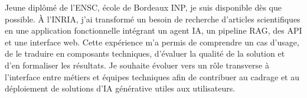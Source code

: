 
\begin{cvparagraph}
Jeune diplômé de l’ENSC, école de Bordeaux INP, je suis disponible dès que possible. À l’INRIA, j’ai transformé un besoin de recherche d’articles scientifiques en une application fonctionnelle intégrant un agent IA, un pipeline RAG, des API et une interface web. Cette expérience m’a permis de comprendre un cas d’usage, de le traduire en composants techniques, d’évaluer la qualité de la solution et d’en formaliser les résultats. Je souhaite évoluer vers un rôle transverse à l’interface entre métiers et équipes techniques afin de contribuer au cadrage et au déploiement de solutions d’IA générative utiles aux utilisateurs.
\end{cvparagraph}
